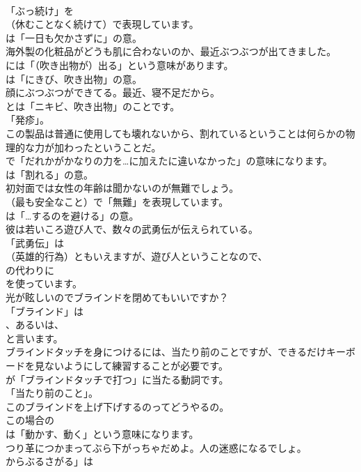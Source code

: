 \documentclass[8pt]{extreport}
\begin{document}
\begin{CJK}{UTF8}{min}
\\	「ぶっ続け」を 
\\	（休むことなく続けて）で表現しています。
\\	は「一日も欠かさずに」の意。	
\\	海外製の化粧品がどうも肌に合わないのか、最近ぶつぶつが出てきました。 
\\	には「（吹き出物が）出る」という意味があります。
\\	は「にきび、吹き出物」の意。	
\\	顔にぶつぶつができてる。最近、寝不足だから。 
\\	とは「ニキビ、吹き出物」のことです。
\\	「発疹」。	
\\	この製品は普通に使用しても壊れないから、割れているということは何らかの物理的な力が加わったということだ。 
\\	で「だれかがかなりの力を…に加えたに違いなかった」の意味になります。
\\	は「割れる」の意。	
\\	初対面では女性の年齢は聞かないのが無難でしょう。 
\\	（最も安全なこと）で「無難」を表現しています。
\\	は「…するのを避ける」の意。	
\\	彼は若いころ遊び人で、数々の武勇伝が伝えられている。 
\\	「武勇伝」は
\\	（英雄的行為）ともいえますが、遊び人ということなので、
\\	の代わりに
\\	を使っています。	
\\	光が眩しいのでブラインドを閉めてもいいですか？ 
\\	「ブラインド」は
\\	、あるいは、
\\	と言います。	
\\	ブラインドタッチを身につけるには、当たり前のことですが、できるだけキーボードを見ないようにして練習することが必要です。 
\\	が「ブラインドタッチで打つ」に当たる動詞です。
\\	「当たり前のこと」。	
\\	このブラインドを上げ下げするのってどうやるの。 
\\	この場合の
\\	は「動かす、動く」という意味になります。	
\\	つり革につかまってぶら下がっちゃだめよ。人の迷惑になるでしょ。 
\\	からぶるさがる」は

\end{CJK}
\end{document}
